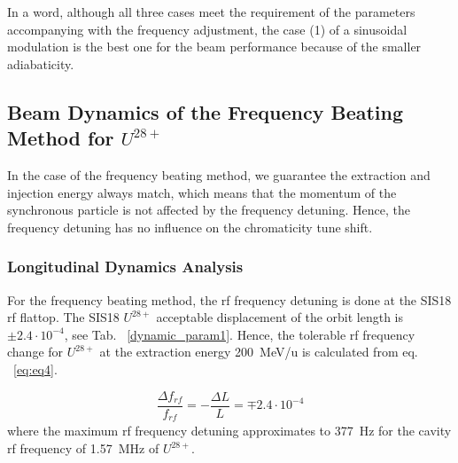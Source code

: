 In a word, although all three cases meet the requirement of the parameters accompanying with the frequency adjustment, the case (1) of a sinusoidal modulation is the best one for the beam performance because of the smaller adiabaticity.  
\subsection{Beam Dynamics of the Frequency Beating Method for $U^\mathit{28+}$} 
In the case of the frequency beating method, we guarantee the extraction and injection energy always match, which means that the momentum of the synchronous particle is not affected by the frequency detuning. Hence, the frequency detuning has no influence on the chromaticity tune shift.

\subsubsection{Longitudinal Dynamics Analysis}
 
For the frequency beating method, the rf frequency detuning is done at the SIS18 rf flattop. The SIS18 $U^\mathit{28+}$ acceptable displacement of the orbit length is $\pm2.4\cdot 10^{-4}$, see Tab. ~\ref{dynamic_param1}. Hence, the tolerable rf frequency change for $U^{28+}$ at the extraction energy \SI{200}{MeV/u} is calculated from eq. ~\ref{eq:eq4}.

\begin{equation}
\frac{\Delta{f}_\mathit{rf}}{f_\mathit{rf}} = -\frac{\Delta L}{L}= \mp 2.4 \cdot 10^{-4}
\end{equation}
where the maximum rf frequency detuning approximates to \SI{377}{Hz} for the cavity rf frequency of \SI{1.57}{MHz} of $U^{28+}$.

